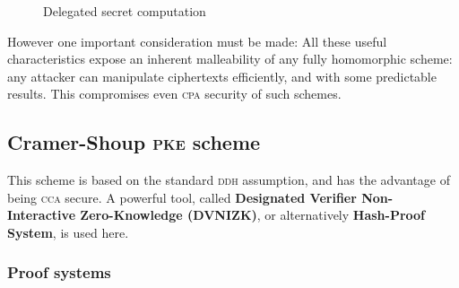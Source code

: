 
\begin{figure}[h!]
    \centering
    \sdinit{}
    \caption{Delegated secret computation}
    \label{seq:delseccomp}
\end{figure}

However one important consideration must be made: All these useful characteristics expose an inherent malleability of any fully homomorphic scheme: any attacker can manipulate ciphertexts efficiently, and with some predictable results. This compromises even \textsc{cpa} security of such schemes.

\subsection{Cramer-Shoup \textsc{pke} scheme}

This scheme is based on the standard \textsc{ddh} assumption, and has the advantage of being \textsc{cca} secure. A powerful tool, called \textbf{Designated Verifier Non-Interactive Zero-Knowledge (DVNIZK)}, or alternatively \textbf{Hash-Proof System}, is used here.

\subsubsection{Proof systems}

